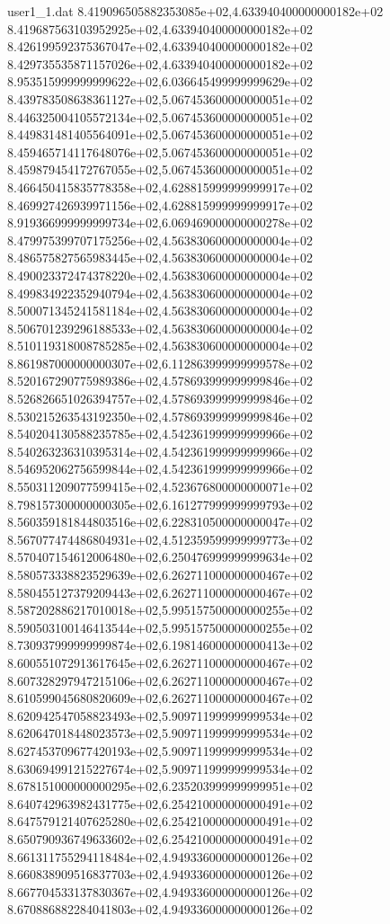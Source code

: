 \begin{filecontents}{user1_1.dat}
8.419096505882353085e+02,4.633940400000000182e+02
8.419687563103952925e+02,4.633940400000000182e+02
8.426199592375367047e+02,4.633940400000000182e+02
8.429735535871157026e+02,4.633940400000000182e+02
8.953515999999999622e+02,6.036645499999999629e+02
8.439783508638361127e+02,5.067453600000000051e+02
8.446325004105572134e+02,5.067453600000000051e+02
8.449831481405564091e+02,5.067453600000000051e+02
8.459465714117648076e+02,5.067453600000000051e+02
8.459879454172767055e+02,5.067453600000000051e+02
8.466450415835778358e+02,4.628815999999999917e+02
8.469927426939971156e+02,4.628815999999999917e+02
8.919366999999999734e+02,6.069469000000000278e+02
8.479975399707175256e+02,4.563830600000000004e+02
8.486575827565983445e+02,4.563830600000000004e+02
8.490023372474378220e+02,4.563830600000000004e+02
8.499834922352940794e+02,4.563830600000000004e+02
8.500071345241581184e+02,4.563830600000000004e+02
8.506701239296188533e+02,4.563830600000000004e+02
8.510119318008785285e+02,4.563830600000000004e+02
8.861987000000000307e+02,6.112863999999999578e+02
8.520167290775989386e+02,4.578693999999999846e+02
8.526826651026394757e+02,4.578693999999999846e+02
8.530215263543192350e+02,4.578693999999999846e+02
8.540204130588235785e+02,4.542361999999999966e+02
8.540263236310395314e+02,4.542361999999999966e+02
8.546952062756599844e+02,4.542361999999999966e+02
8.550311209077599415e+02,4.523676800000000071e+02
8.798157300000000305e+02,6.161277999999999793e+02
8.560359181844803516e+02,6.228310500000000047e+02
8.567077474486804931e+02,4.512359599999999773e+02
8.570407154612006480e+02,6.250476999999999634e+02
8.580573338823529639e+02,6.262711000000000467e+02
8.580455127379209443e+02,6.262711000000000467e+02
8.587202886217010018e+02,5.995157500000000255e+02
8.590503100146413544e+02,5.995157500000000255e+02
8.730937999999999874e+02,6.198146000000000413e+02
8.600551072913617645e+02,6.262711000000000467e+02
8.607328297947215106e+02,6.262711000000000467e+02
8.610599045680820609e+02,6.262711000000000467e+02
8.620942547058823493e+02,5.909711999999999534e+02
8.620647018448023573e+02,5.909711999999999534e+02
8.627453709677420193e+02,5.909711999999999534e+02
8.630694991215227674e+02,5.909711999999999534e+02
8.678151000000000295e+02,6.235203999999999951e+02
8.640742963982431775e+02,6.254210000000000491e+02
8.647579121407625280e+02,6.254210000000000491e+02
8.650790936749633602e+02,6.254210000000000491e+02
8.661311755294118484e+02,4.949336000000000126e+02
8.660838909516837703e+02,4.949336000000000126e+02
8.667704533137830367e+02,4.949336000000000126e+02
8.670886882284041803e+02,4.949336000000000126e+02

\end{filecontents}
